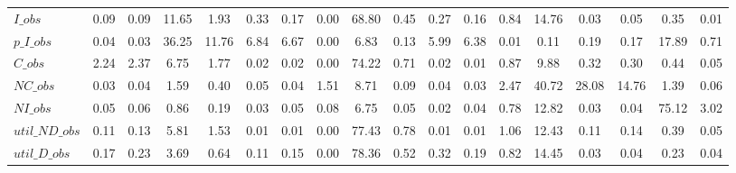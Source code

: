 \begin{center}
\begin{longtable}{lccccccccccccccccc}
$I\_obs         $	 & 	            0.09	 & 	            0.09	 & 	           11.65	 & 	            1.93	 & 	            0.33	 & 	            0.17	 & 	            0.00	 & 	           68.80	 & 	            0.45	 & 	            0.27	 & 	            0.16	 & 	            0.84	 & 	           14.76	 & 	            0.03	 & 	            0.05	 & 	            0.35	 & 	            0.01 \\ 
$p\_I\_obs      $	 & 	            0.04	 & 	            0.03	 & 	           36.25	 & 	           11.76	 & 	            6.84	 & 	            6.67	 & 	            0.00	 & 	            6.83	 & 	            0.13	 & 	            5.99	 & 	            6.38	 & 	            0.01	 & 	            0.11	 & 	            0.19	 & 	            0.17	 & 	           17.89	 & 	            0.71 \\ 
$C\_obs         $	 & 	            2.24	 & 	            2.37	 & 	            6.75	 & 	            1.77	 & 	            0.02	 & 	            0.02	 & 	            0.00	 & 	           74.22	 & 	            0.71	 & 	            0.02	 & 	            0.01	 & 	            0.87	 & 	            9.88	 & 	            0.32	 & 	            0.30	 & 	            0.44	 & 	            0.05 \\ 
$NC\_obs        $	 & 	            0.03	 & 	            0.04	 & 	            1.59	 & 	            0.40	 & 	            0.05	 & 	            0.04	 & 	            1.51	 & 	            8.71	 & 	            0.09	 & 	            0.04	 & 	            0.03	 & 	            2.47	 & 	           40.72	 & 	           28.08	 & 	           14.76	 & 	            1.39	 & 	            0.06 \\ 
$NI\_obs        $	 & 	            0.05	 & 	            0.06	 & 	            0.86	 & 	            0.19	 & 	            0.03	 & 	            0.05	 & 	            0.08	 & 	            6.75	 & 	            0.05	 & 	            0.02	 & 	            0.04	 & 	            0.78	 & 	           12.82	 & 	            0.03	 & 	            0.04	 & 	           75.12	 & 	            3.02 \\ 
$util\_ND\_obs  $	 & 	            0.11	 & 	            0.13	 & 	            5.81	 & 	            1.53	 & 	            0.01	 & 	            0.01	 & 	            0.00	 & 	           77.43	 & 	            0.78	 & 	            0.01	 & 	            0.01	 & 	            1.06	 & 	           12.43	 & 	            0.11	 & 	            0.14	 & 	            0.39	 & 	            0.05 \\ 
$util\_D\_obs   $	 & 	            0.17	 & 	            0.23	 & 	            3.69	 & 	            0.64	 & 	            0.11	 & 	            0.15	 & 	            0.00	 & 	           78.36	 & 	            0.52	 & 	            0.32	 & 	            0.19	 & 	            0.82	 & 	           14.45	 & 	            0.03	 & 	            0.04	 & 	            0.23	 & 	            0.04 \\ 

\end{longtable}
\end{center}
